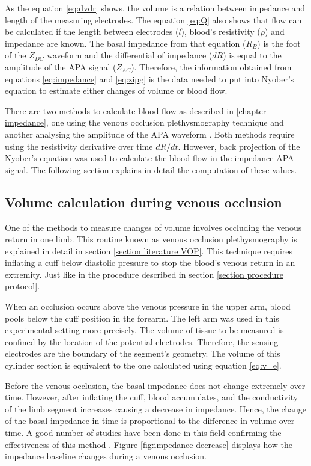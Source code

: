 As the equation \ref{eq:dvdr} shows, the volume is a relation between impedance and length of the measuring electrodes. The equation \ref{eq:Q} also shows that flow can be calculated if the length between electrodes ($l$), blood's resistivity ($\rho$) and impedance are known.  The basal impedance from that equation ($R_B$) is the foot of the $Z_{DC}$ waveform and the differential of impedance ($dR$) is equal to the amplitude of the APA signal ($Z_{AC}$). Therefore, the information obtained from equations \ref{eq:impedance} and \ref{eq:zipg} is the data needed to put into Nyober's equation to estimate either changes of volume or blood flow.

There are two methods to calculate blood flow as described in \ref{chapter impedance}, one using the venous occlusion plethysmography technique \cite{anderson1984impedance,costeloe1980continuous,mohapatra1981non,golden1986assessment} and another analysing the amplitude of the APA waveform \cite{nyboer1974blood,costeloe1980continuous}. Both methods require using the resistivity derivative over time $dR/dt$. However, back projection of the Nyober's equation was used to calculate the blood flow in the impedance APA signal. The following section explains in detail the computation of these values.  

\subsection{Volume calculation during venous occlusion}
\label{section procedure volume vop}
One of the methods to measure changes of volume involves occluding the venous return in one limb. This routine known as venous occlusion plethysmography is explained in detail in section \ref{section literature VOP}. This technique requires inflating a cuff below diastolic pressure to stop the blood's venous return in an extremity. Just like in the procedure described in section \ref{section procedure protocol}. 

When an occlusion occurs above the venous pressure in the upper arm, blood pools below the cuff position in the forearm. The left arm was used in this experimental setting more precisely. The volume of tissue to be measured is confined by the location of the potential electrodes. Therefore, the sensing electrodes are the boundary of the segment's geometry. The volume of this cylinder section is equivalent to the one calculated using equation \ref{eq:v_e}. 

Before the venous occlusion, the basal impedance does not change extremely over time. However, after inflating the cuff, blood accumulates, and the conductivity of the limb segment increases causing a decrease in impedance. Hence, the change of the basal impedance in time is proportional to the difference in volume over time. A good number of studies have been done in this field confirming the effectiveness of this method \cite{golden1986assessment,anderson1984impedance, costeloe1980continuous,mohapatra1981non}. Figure \ref{fig:impedance decrease} displays how the impedance baseline changes during a venous occlusion. 

